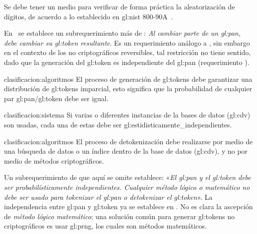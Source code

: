 {
  Se debe tener un medio para verificar de forma práctica la aleatorización
  de dígitos, de acuerdo a lo establecido en \gls{gl:nist}
  800-90A~\cite{nist_aleatorios}.
}

En~\cite{pci_tokens} se establece un subrequerimiento más de
: \textit{Al cambiar parte de un
\gls{gl:pan}, debe cambiar su \gls{gl:token} resultante}. Es un requerimiento
análogo a , sin embargo en el contexto
de los  no criptográficos reversibles, tal restricción no tiene sentido, dado
que  la generación del \gls{gl:token} es independiente del \gls{gl:pan}
(requerimiento ).

{clasificacion:algoritmos}
{
  El proceso de generación de \glspl{gl:token} debe garantizar una
  distribución de \glspl{gl:token} imparcial, esto significa que la
  probabilidad de cualquier par \gls{gl:pan}/\gls{gl:token} debe ser igual.
}

{clasificacion:sistema}
{
  Si varias o diferentes instancias de la bases de datos (\gls{gl:cdv}) son
  usadas, cada una de estas debe ser
  \glspl{gl:estidisticamente_independiente}.
}

{clasificacion:algoritmos}
{
  El proceso de detokenización debe realizarse por medio de una búsqueda de
  datos o un índice dentro de la base de datos (\gls{gl:cdv}), y no por medio
  de métodos criptográficos.
}


Un subrequerimiento de  que
aquí se omite establece: «\textit{El \gls{gl:pan} y el \gls{gl:token} debe ser
probabilísticamente independientes. Cualquier método lógico o matemático no
debe ser usado para \textit{tokenizar} el \gls{gl:pan} o \textit{detokenizar}
el \gls{gl:token}}». La independencia entre \gls{gl:pan} y \gls{gl:token} ya
se establece en . No es
clara la ascepción de \textit{método lógico matemático}; una solución
común para generar \glspl{gl:token} no criptográficos es usar \gls{gl:prng},
los cuales son métodos matemáticos.

